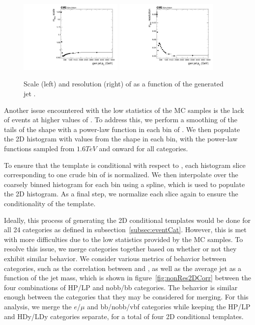 \begin{figure}[htbp]
  \centering
  \includegraphics[width=0.45\textwidth]{fig/2Dfit/detectorParam_nonRes_scale_MVV.pdf}
  \includegraphics[width=0.45\textwidth]{fig/2Dfit/detectorParam_nonRes_resolution_MVV.pdf}
  \caption{
    Scale (left) and resolution (right) of \MVV as a function of the generated jet \pt.
  }
  \label{fig:nonResScaleResMVV}
\end{figure}

Another issue encountered with the low statistics of the MC samples is the lack of events at higher values of \MVV.
To address this, we perform a smoothing of the tails of the \MVV shape with a power-law function in each bin of \MJ.
We then populate the 2D histogram with values from the \MVV shape in each \MJ bin, with the power-law functions sampled from $1.6\unit{TeV}$ and onward for all categories.

To ensure that the template is conditional with respect to \MJ, each histogram slice corresponding to one crude bin of \MJ is normalized.
We then interpolate over the coarsely binned \MJ histogram for each \MVV bin using a spline, which is used to populate the 2D histogram.
As a final step, we normalize each \MJ slice again to ensure the conditionality of the template.

Ideally, this process of generating the 2D conditional templates would be done for all 24 categories as defined in subsection~\ref{subsec:eventCat}.
However, this is met with more difficulties due to the low statistics provided by the MC samples.
To resolve this issue, we merge categories together based on whether or not they exhibit similar behavior.
We consider various metrics of behavior between categories, such as the correlation between \MJ and \MVV, as well as the average jet \pt as a function of the jet mass, which is shown in figure~\ref{fig:nonRes2DCorr} between the four combinations of HP/LP and nobb/bb categories.
The behavior is similar enough between the categories that they may be considered for merging.
For this analysis, we merge the $e$/$\mu$ and bb/nobb/vbf categories while keeping the HP/LP and HDy/LDy categories separate, for a total of four 2D conditional templates.

